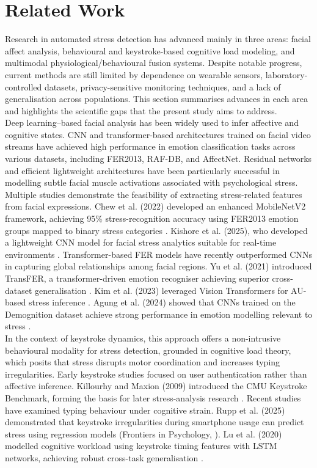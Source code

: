 \documentclass[fleqn,10pt]{wlscirep}
\begin{document}
\section*{Related Work}
Research in automated stress detection has advanced mainly in three areas: facial affect analysis, behavioural and keystroke-based cognitive load modeling, and multimodal physiological/behavioural fusion systems. Despite notable progress, current methods are still limited by dependence on wearable sensors, laboratory-controlled datasets, privacy-sensitive monitoring techniques, and a lack of generalisation across populations. This section summarises advances in each area and highlights the scientific gaps that the present study aims to address.\\
Deep learning–based facial analysis has been widely used to infer affective and cognitive states. CNN and transformer-based architectures trained on facial video streams have achieved high performance in emotion classification tasks across various datasets, including FER2013, RAF-DB, and AffectNet. Residual networks and efficient lightweight architectures have been particularly successful in modelling subtle facial muscle activations associated with psychological stress. Multiple studies demonstrate the feasibility of extracting stress-related features from facial expressions. Chew et al. (2022) developed an enhanced MobileNetV2 framework, achieving 95\% stress-recognition accuracy using FER2013 emotion groups mapped to binary stress categories \cite{chew2022}.  
Kishore et al. (2025), who developed a lightweight CNN model for facial stress analytics suitable for real-time environments \cite{kishore2025}.
Transformer-based FER models have recently outperformed CNNs in capturing global relationships among facial regions. Yu et al. (2021) introduced TransFER, a transformer-driven emotion recogniser achieving superior cross-dataset generalisation \cite{yu2021}. Kim et al. (2023) leveraged Vision Transformers for AU-based stress inference \cite{kim2023}. 
Agung et al. (2024) showed that CNNs trained on the Demognition dataset achieve strong performance in emotion modelling relevant to stress \cite{agung2024}.\\
In the context of keystroke dynamics, this approach offers a non-intrusive behavioural modality for stress detection, grounded in cognitive load theory, which posits that stress disrupts motor coordination and increases typing irregularities. Early keystroke studies focused on user authentication rather than affective inference. Killourhy and Maxion (2009) introduced the CMU Keystroke Benchmark, forming the basis for later stress-analysis research \cite{killourhy2009}. Recent studies have examined typing behaviour under cognitive strain. Rupp et al. (2025) demonstrated that keystroke irregularities during smartphone usage can predict stress using regression models (Frontiers in Psychology, \cite{rupp2025}). Lu et al. (2020) modelled cognitive workload using keystroke timing features with LSTM networks, achieving robust cross-task generalisation \cite{liu2020}.\\
\end{document}

